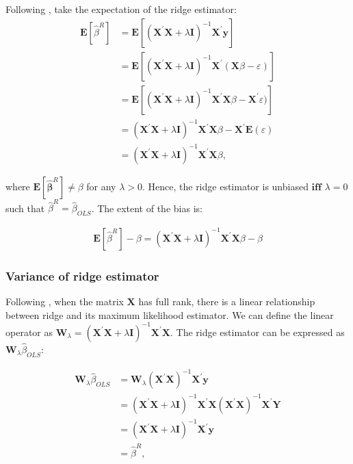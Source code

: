 Following \cite{van2015lecture}, take the expectation of the ridge estimator:
\begin{align*}
\mathbf{E}\left[\hat{\beta}^{R}\right] &=\mathbf{E}\left[\left(\mathbf{X}^{\prime} \mathbf{X}+\lambda \mathbf{I}\right)^{-1} \mathbf{X}^{\prime} \mathbf{y}\right]\\
&=\mathbf{E}\left[\left(\mathbf{X}^{\prime} \mathbf{X}+\lambda \mathbf{I}\right)^{-1} \mathbf{X}^{\prime} (\mathbf{X}\beta - \varepsilon)\right]\\
&=\mathbf{E}\left[\left(\mathbf{X}^{\prime} \mathbf{X}+\lambda \mathbf{I}\right)^{-1} \mathbf{X}^{\prime} \mathbf{X} \beta - \mathbf{X}^{\prime} \varepsilon)\right]\\
&=\left(\mathbf{X}^{\prime} \mathbf{X}+\lambda \mathbf{I}\right)^{-1} \mathbf{X}^{\prime} \mathbf{X} \beta - \mathbf{X}^{\prime} \mathbf{E}(\varepsilon)\\
&=\left(\mathbf{X}^{\prime} \mathbf{X}+\lambda \mathbf{I}\right)^{-1} \mathbf{X}^{\prime} \mathbf{X} \beta,
\end{align*}

\noindent where $\mathbf{E}\left[\hat{\boldsymbol{\beta}}^{R}\right] \neq \beta$ for any $\lambda >0$. Hence, the ridge estimator is unbiased $\mathbf{iff}$ $\lambda=0$ such that $\hat{\beta}^R=\hat{\beta}_{OLS}$. The extent of the bias is:

\begin{align*}
\mathbf{E}\left[\hat{\beta}^{R}\right] - \beta=\left(\mathbf{X}^{\prime} \mathbf{X}+\lambda \mathbf{I}\right)^{-1} \mathbf{X}^{\prime} \mathbf{X} \beta - \beta
\end{align*}

\subsubsection{Variance of ridge estimator} \label{proofvar}
Following \cite{van2015lecture}, when the matrix $\mathbf{X}$ has full rank, there is a linear relationship between ridge and its maximum likelihood estimator. We can define the linear operator as $\mathbf{W}_\lambda=\left(\mathbf{X}^{\prime} \mathbf{X}+\lambda \mathbf{I}\right)^{-1} \mathbf{X}^{\prime} \mathbf{X}$. The ridge estimator can be expressed as $\mathbf{W}_\lambda \hat{\beta}_{OLS}$:

\begin{align*}
\mathbf{W}_{\lambda} \hat{\beta}_{OLS} &=\mathbf{W}_{\lambda}\left(\mathbf{X}^{\prime} \mathbf{X}\right)^{-1} \mathbf{X}^{\prime} \mathbf{y} \\
&=\left(\mathbf{X}^{\prime} \mathbf{X}+\lambda \mathbf{I}\right)^{-1} \mathbf{X}^{\prime} \mathbf{X}\left(\mathbf{X}^{\prime} \mathbf{X}\right)^{-1} \mathbf{X}^{\prime} \mathbf{Y} \\
&=\left(\mathbf{X}^{\prime} \mathbf{X}+\lambda \mathbf{I}\right)^{-1} \mathbf{X}^{\prime} \mathbf{y} \\
&=\hat{\beta}^{R},
\end{align*}

